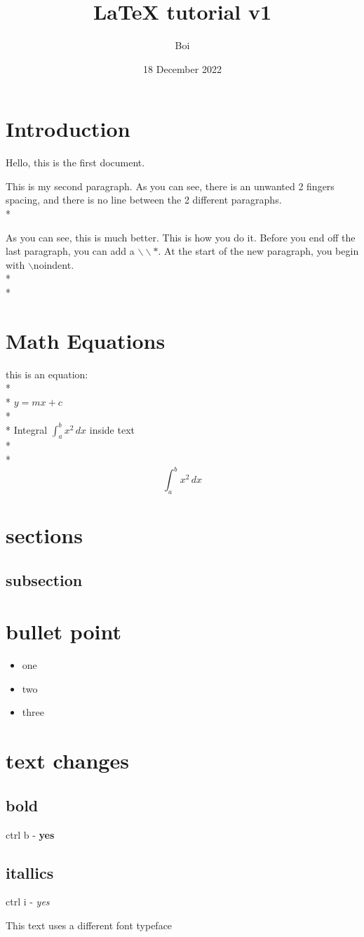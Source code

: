 \documentclass{article}
\title{LaTeX tutorial v1}
\author{Boi}
\date{18 December 2022}
\begin{document}
\maketitle

\section{Introduction}
Hello, this is the first document.


This is my second paragraph. As you can see, there is an unwanted 2 fingers spacing, and there is no line between the 2 different paragraphs. \\*

\noindent As you can see, this is much better. 
\noindent This is how you do it. Before you end off the last paragraph, you can add a $\backslash \backslash *$. At the start of the new paragraph, you begin with  $\backslash$noindent. \\*\\*

\section{Math Equations}
this is an equation:    \\* \\*
\noindent $y=mx+c$  \\* \\*
Integral \(\int_{a}^{b} x^2 \,dx\) inside text \\* \\*
\[ \int_{a}^{b} x^2 \,dx \]

\newpage
\section{sections}
\subsection{subsection}

\newpage
\section{bullet point}
\begin{itemize}
    \item one
    \item two
    \item three
\end{itemize}

\newpage
\section{text changes}
\subsection{bold}
ctrl b - 
\textbf{yes}
\subsection{itallics}
ctrl i -
\textit{yes}


{\selectfont
This text uses a different font typeface
}
\end{document}
